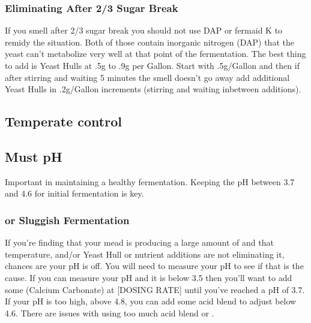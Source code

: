 \documentclass{article}
\begin{document}
  \subsubsection{Eliminating After 2/3 Sugar Break} 
   If you smell  after 2/3 sugar break you should not use DAP or fermaid K to remidy the situation. Both of those contain inorganic nitrogen (DAP) 
   that the yeast can't metabolize very well at that point of the fermentation. The best thing to add is Yeast Hulls at .5g to .9g per Gallon. Start with .5g/Gallon and
   then if after stirring and waiting 5 minutes the  smell doesn't go away add additional Yeast Hulls in .2g/Gallon increments (stirring and waiting inbetween
   additions).

 \subsection{Temperate control}

 \subsection{Must pH}
  Important in maintaining a healthy fermentation. Keeping the pH between 3.7 and 4.6 for initial fermentation is key.

  \subsubsection{ or Sluggish Fermentation}
   If you're finding that your mead is producing a large amount of  and that temperature, and/or Yeast Hull or nutrient additions are not eliminating it, 
   chances are your pH is off. You will need to measure your pH to see if that is the cause. If you can measure your pH and it is
   below 3.5 then you'll want to add some  (Calcium Carbonate) at [DOSING RATE] until you've reached a pH of 3.7. If your pH is too high, above 4.8, 
   you can add some acid blend to adjust below 4.6. There are issues with using too much acid blend or .
\end{document}
